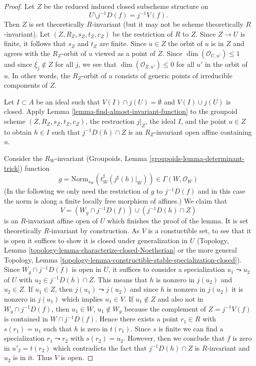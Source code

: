 \begin{proof}
\medskip\noindent
Let $Z$ be the reduced induced closed subscheme structure on
$$
U \setminus j^{-1}D(f) = j^{-1}V(f).
$$
Then $Z$ is set theoretically
$R$-invariant (but it may not be scheme theoretically $R$-invariant).
Let $(Z, R_Z, s_Z, t_Z, c_Z)$ be the restriction of $R$ to $Z$.
Since $Z \to U$ is finite, it follows that $s_Z$ and $t_Z$ are finite.
Since $u \in Z$ the orbit of $u$ is in $Z$ and agrees with the
$R_Z$-orbit of $u$ viewed as a point of $Z$. Since
$\dim(\mathcal{O}_{U, u'}) \leq 1$ and since $\xi_j \not \in Z$
for all $j$, we see that $\dim(\mathcal{O}_{Z, u'}) \leq 0$ for
all $u'$ in the orbit of $u$. In other words, the $R_Z$-orbit of $u$
consists of generic points of irreducible components of $Z$.

\medskip\noindent
Let $I \subset A$ be an ideal such that $V(I) \cap j(U) =\emptyset$
and $V(I) \cup j(U)$ is closed. Apply
Lemma \ref{lemma-find-almost-invariant-function} to
the groupoid scheme $(Z, R_Z, s_Z, t_Z, c_Z)$, the restruction $j|_Z$,
the ideal $I$, and the point $u \in Z$ to obtain $h \in I$ such that
$j^{-1}D(h) \cap Z$ is an $R_Z$-invariant open affine containing $u$.

\medskip\noindent
Consider the $R_W$-invariant (Groupoids, Lemma
\ref{groupoids-lemma-determinant-trick}) function
$$
g = 
\text{Norm}_{s_W}(t_W^\sharp(j^\sharp(h)|_W)) \in \Gamma(W, \mathcal{O}_W)
$$
(In the following we only need the restriction of $g$ to $j^{-1}D(f)$ and
in this case the norm is along a finite locally free morphism of affines.)
We claim that
$$
V = (W_g \cap j^{-1}D(f)) \cup (j^{-1}D(h) \cap Z)
$$
is an $R$-invariant affine open of $U$ which finishes the proof of the lemma.
It is set theoretically $R$-invariant by construction. As $V$ is a
constuctible set, to see that it is open it suffices to show it is
closed under generalization in $U$ (Topology, Lemma
\ref{topology-lemma-characterize-closed-Noetherian}
or the more general
Topology, Lemma
\ref{topology-lemma-constructible-stable-specialization-closed}).
Since $W_g \cap j^{-1}D(f)$ is open in $U$, it suffices to consider
a specialization $u_1 \leadsto u_2$ of $U$ with
$u_2 \in j^{-1}D(h) \cap Z$.
This means that $h$ is nonzero in $j(u_2)$ and $u_2 \in Z$.
If $u_1 \in Z$, then $j(u_1) \leadsto j(u_2)$ and since
$h$ is nonzero in $j(u_2)$ it is nonzero in $j(u_1)$ which
implies $u_1 \in V$. If $u_1 \not \in Z$ and
also not in $W_g \cap j^{-1}D(f)$, then $u_1 \in W$, $u_1 \not \in W_g$
because the complement of $Z = j^{-1}V(f)$ is contained in $W \cap j^{-1}D(f)$.
Hence there exists a point $r_1 \in R$ with $s(r_1) = u_1$
such that $h$ is zero in $t(r_1)$. Since $s$ is finite we
can find a specialization $r_1 \leadsto r_2$ with $s(r_2) = u_2$.
However, then we conclude that $f$ is zero in $u'_2 = t(r_2)$
which contradicts the fact that $j^{-1}D(h) \cap Z$
is $R$-invariant and $u_2$ is in it. Thus $V$ is open.


\end{proof}
